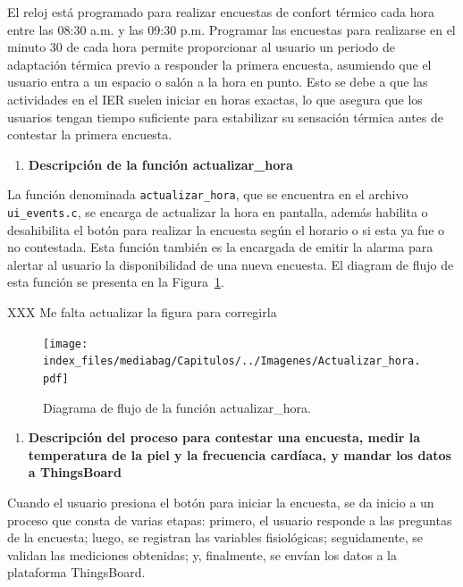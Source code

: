 \documentclass[
  12pt,
  letterpaper,
  DIV=11,
  numbers=noendperiod]{scrreport}
\providecommand{\tightlist}{%
  \setlength{\itemsep}{0pt}\setlength{\parskip}{0pt}}\usepackage{longtable,booktabs,array}
\begin{document}
El reloj está programado para realizar encuestas de confort térmico cada
hora entre las 08:30 a.m. y las 09:30 p.m. Programar las encuestas para
realizarse en el minuto 30 de cada hora permite proporcionar al usuario
un periodo de adaptación térmica previo a responder la primera encuesta,
asumiendo que el usuario entra a un espacio o salón a la hora en punto.
Esto se debe a que las actividades en el IER suelen iniciar en horas
exactas, lo que asegura que los usuarios tengan tiempo suficiente para
estabilizar su sensación térmica antes de contestar la primera encuesta.

\begin{enumerate}
\def\labelenumi{\arabic{enumi}.}
\setcounter{enumi}{1}
\tightlist
\item
  \textbf{Descripción de la función actualizar\_hora}
\end{enumerate}

La función denominada \texttt{actualizar\_hora}, que se encuentra en el
archivo \texttt{ui\_events.c}, se encarga de actualizar la hora en
pantalla, además habilita o desahibilita el botón para realizar la
encuesta según el horario o si esta ya fue o no contestada. Esta función
también es la encargada de emitir la alarma para alertar al usuario la
disponibilidad de una nueva encuesta. El diagram de flujo de esta
función se presenta en la Figura~\ref{fig-actualizarhora}.

XXX Me falta actualizar la figura para corregirla

\begin{figure}

{\centering \texttt{[image: index\_files/mediabag/Capitulos/../Imagenes/Actualizar\_hora.pdf]}

}

\caption{\label{fig-actualizarhora}Diagrama de flujo de la función
actualizar\_hora.}

\end{figure}

\begin{enumerate}
\def\labelenumi{\arabic{enumi}.}
\setcounter{enumi}{2}
\tightlist
\item
  \textbf{Descripción del proceso para contestar una encuesta, medir la
  temperatura de la piel y la frecuencia cardíaca, y mandar los datos a
  ThingsBoard}
\end{enumerate}

Cuando el usuario presiona el botón para iniciar la encuesta, se da
inicio a un proceso que consta de varias etapas: primero, el usuario
responde a las preguntas de la encuesta; luego, se registran las
variables fisiológicas; seguidamente, se validan las mediciones
obtenidas; y, finalmente, se envían los datos a la plataforma
ThingsBoard.
\end{document}
